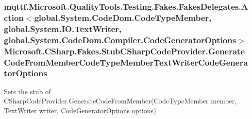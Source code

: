 \hypertarget{class_microsoft_1_1_c_sharp_1_1_fakes_1_1_stub_c_sharp_code_provider_a0946e16abe2b619e49d18e4e9c7af85c}{
\subsubsection[{Generate\-Code\-From\-Member\-Code\-Type\-Member\-Text\-Writer\-Code\-Generator\-Options}]{\setlength{\rightskip}{0pt plus 5cm}mqttf.\-Microsoft.\-Quality\-Tools.\-Testing.\-Fakes.\-Fakes\-Delegates.\-Action$<$global.\-System.\-Code\-Dom.\-Code\-Type\-Member, global.\-System.\-I\-O.\-Text\-Writer, global.\-System.\-Code\-Dom.\-Compiler.\-Code\-Generator\-Options$>$ Microsoft.\-C\-Sharp.\-Fakes.\-Stub\-C\-Sharp\-Code\-Provider.\-Generate\-Code\-From\-Member\-Code\-Type\-Member\-Text\-Writer\-Code\-Generator\-Options}}\label{class_microsoft_1_1_c_sharp_1_1_fakes_1_1_stub_c_sharp_code_provider_a0946e16abe2b619e49d18e4e9c7af85c}


Sets the stub of C\-Sharp\-Code\-Provider.\-Generate\-Code\-From\-Member(\-Code\-Type\-Member member, Text\-Writer writer, Code\-Generator\-Options options)

